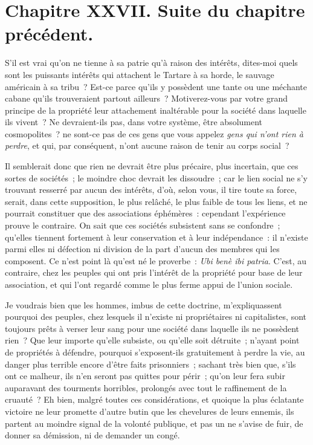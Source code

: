 \documentclass[french,twoside]{book} %
\newcommand\chapteropen{} %
\newcommand\chaptercont{} %
\begin{document}
\chapteropen
\chapter[{Chapitre XXVII. Suite du chapitre précédent.}]{Chapitre XXVII. Suite du chapitre précédent.}\renewcommand{\leftmark}{Chapitre XXVII. Suite du chapitre précédent.}


\chaptercont
\noindent S’il est vrai qu’on ne tienne à sa patrie qu’à raison des intérêts, dites-moi quels sont les puissants intérêts qui attachent le Tartare à sa horde, le sauvage américain à sa tribu ? Est-ce parce qu’ils y possèdent une tante ou une méchante cabane qu’ils trouveraient partout ailleurs ? Motiverez-vous par votre grand principe de la propriété leur attachement inaltérable pour la société dans laquelle ils vivent ? Ne devraient-ils pas, dans votre système, être absolument cosmopolites ? ne sont-ce pas de ces gens que vous appelez {\itshape gens qui n’ont rien à perdre}, et qui, par conséquent, n’ont aucune raison de tenir au corps social ?\par
Il semblerait donc que rien ne devrait être plus précaire, plus incertain, que ces sortes de sociétés ; le moindre choc devrait les dissoudre ; car le lien social ne s’y trouvant resserré par aucun des intérêts, d’où, selon vous, il tire toute sa force, serait, dans cette supposition, le plus relâché, le plus faible de tous les liens, et ne pourrait constituer que des associations éphémères : cependant l’expérience prouve le contraire. On sait que ces sociétés subsistent sans se confondre ; qu’elles tiennent fortement à leur conservation et à leur indépendance : il n’existe parmi elles ni défection ni division de la part d’aucun des membres qui les composent. Ce n’est point là qu’est né le proverbe : {\itshape Ubi benè ibi patria}. C’est, au contraire, chez les peuples qui ont pris l’intérêt de la propriété pour base de leur association, et qui l’ont regardé comme le plus ferme appui de l’union sociale.\par
Je voudrais bien que les hommes, imbus de cette doctrine, m’expliquassent pourquoi des peuples, chez lesquels il n’existe ni propriétaires ni capitalistes, sont toujours prêts à verser leur sang pour une société dans laquelle ils ne possèdent rien ? Que leur importe qu’elle subsiste, ou qu’elle soit détruite ; n’ayant point de propriétés à défendre, pourquoi s’exposent-ils gratuitement à perdre la vie, au danger plus terrible encore d’être faits prisonniers ; sachant très bien que, s’ils ont ce malheur, ils n’en seront pas quittes pour périr ; qu’on leur fera subir auparavant des tourments horribles, prolongés avec tout le raffinement de la cruauté {\itshape }? Eh bien, malgré toutes ces considérations, et quoique la plus éclatante victoire ne leur promette d’autre butin que les chevelures de leurs ennemis, ils partent au moindre signal de la volonté publique, et pas un ne s’avise de fuir, de donner sa démission, ni de demander un congé.\par
\end{document}
